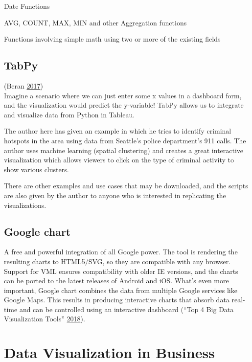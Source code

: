 \documentclass[]{book}
\begin{document}
Date Functions

AVG, COUNT, MAX, MIN and other Aggregation functions

Functions involving simple math using two or more of the existing fields

\hypertarget{tabpy}{%
\subsection{TabPy}\label{tabpy}}

(Beran \protect\hyperlink{ref-TabPy}{2017})\\
Imagine a scenario where we can just enter some x values in a dashboard form, and the visualization would predict the y-variable! TabPy allows us to integrate and visualize data from Python in Tableau.

The author here has given an example in which he tries to identify criminal hotspots in the area using data from Seattle's police department's 911 calls. The author uses machine learning (spatial clustering) and creates a great interactive visualization which allows viewers to click on the type of criminal activity to show various clusters.

There are other examples and use cases that may be downloaded, and the scripts are also given by the author to anyone who is interested in replicating the visualizations.

\hypertarget{google-chart}{%
\subsection{Google chart}\label{google-chart}}

A free and powerful integration of all Google power. The tool is rendering the resulting charts to HTML5/SVG, so they are compatible with any browser. Support for VML ensures compatibility with older IE versions, and the charts can be ported to the latest releases of Android and iOS. What's even more important, Google chart combines the data from multiple Google services like Google Maps. This results in producing interactive charts that absorb data real-time and can be controlled using an interactive dashboard (``Top 4 Big Data Visualization Tools'' \protect\hyperlink{ref-top4_viz_tools}{2018}).

\hypertarget{data-visualization-in-business}{%
\section{Data Visualization in Business}\label{data-visualization-in-business}}
\end{document}
